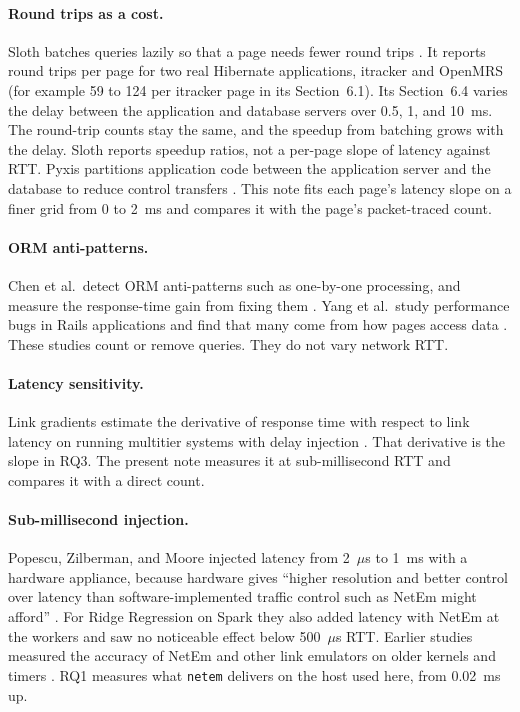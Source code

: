 \documentclass[11pt]{article}
\begin{document}
\paragraph{Round trips as a cost.} Sloth batches queries lazily so that a page needs fewer
round trips \citep{cheung2014sloth}. It reports round trips per page for two real Hibernate
applications, itracker and OpenMRS (for example 59 to 124 per itracker page in its
Section~6.1). Its Section~6.4 varies the delay between the application and database servers
over 0.5, 1, and 10~ms. The round-trip counts stay the same, and the speedup from batching
grows with the delay. Sloth reports speedup ratios, not a per-page slope of latency against
RTT. Pyxis partitions application code between the application server and the database to
reduce control transfers \citep{cheung2012pyxis}. This note fits each page's latency slope on a
finer grid from 0 to 2~ms and compares it with the page's packet-traced count.

\paragraph{ORM anti-patterns.} Chen et al.\ detect ORM anti-patterns such as one-by-one
processing, and measure the response-time gain from fixing them
\citep{chen2014orm,chen2016redundant}. Yang et al.\ study performance bugs in Rails
applications and find that many come from how pages access data \citep{yang2018hownot}.
These studies count or remove queries. They do not vary network RTT.

\paragraph{Latency sensitivity.} Link gradients estimate the derivative of response time
with respect to link latency on running multitier systems with delay injection
\citep{chen2011linkgradients}. That derivative is the slope in RQ3. The present note measures
it at sub-millisecond RTT and compares it with a direct count.

\paragraph{Sub-millisecond injection.} Popescu, Zilberman, and Moore injected latency from
2~$\mu$s to 1~ms with a hardware appliance, because hardware gives ``higher resolution and
better control over latency than software-implemented traffic control such as NetEm might
afford'' \citep{popescu2017latency}. For Ridge Regression on Spark they also added latency with NetEm at
the workers and saw no noticeable effect below 500~$\mu$s RTT. Earlier studies measured the
accuracy of NetEm and other link emulators on older kernels and timers
\citep{nussbaum2009emulators,lubke2014emulators}. RQ1 measures what \texttt{netem} delivers
on the host used here, from 0.02~ms up.
\end{document}
